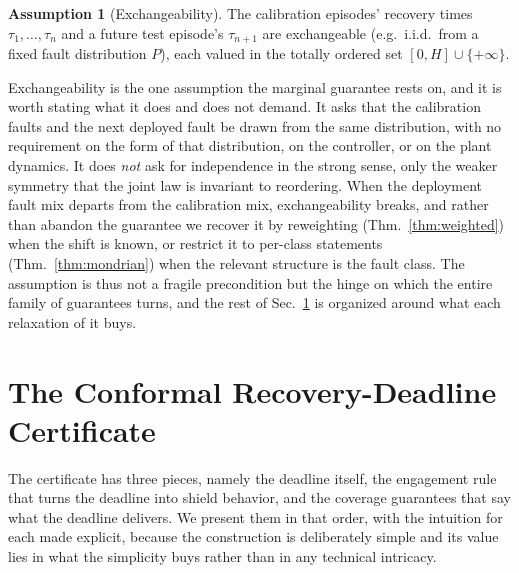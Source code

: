 \documentclass[journal]{IEEEtran}
\theoremstyle{plain}
\theoremstyle{definition}
\newtheorem{assumption}{Assumption}
\begin{document}
\begin{assumption}[Exchangeability]
\label{ass:exch}
The calibration episodes' recovery times $\tau_1,\dots,\tau_n$ and a future test episode's
$\tau_{n+1}$ are exchangeable (e.g.\ i.i.d.\ from a fixed fault distribution $P$), each
valued in the totally ordered set $[0,H]\cup\{+\infty\}$.
\end{assumption}

Exchangeability is the one assumption the marginal guarantee rests on, and it is worth
stating what it does and does not demand. It asks that the calibration faults and the next
deployed fault be drawn from the same distribution, with no requirement on the form of that
distribution, on the controller, or on the plant dynamics. It does \emph{not} ask for
independence in the strong sense, only the weaker symmetry that the joint law is invariant to
reordering. When the deployment fault mix departs from the calibration mix, exchangeability
breaks, and rather than abandon the guarantee we recover it by reweighting
(Thm.~\ref{thm:weighted}) when the shift is known, or restrict it to per-class statements
(Thm.~\ref{thm:mondrian}) when the relevant structure is the fault class. The assumption is
thus not a fragile precondition but the hinge on which the entire family of guarantees
turns, and the rest of Sec.~\ref{sec:cert} is organized around what each relaxation of it
buys.

\section{The Conformal Recovery-Deadline Certificate}
\label{sec:cert}
The certificate has three pieces, namely the deadline itself, the engagement rule that turns
the deadline into shield behavior, and the coverage guarantees that say what the deadline
delivers. We present them in that order, with the intuition for each made explicit, because
the construction is deliberately simple and its value lies in what the simplicity buys rather
than in any technical intricacy.
\end{document}
